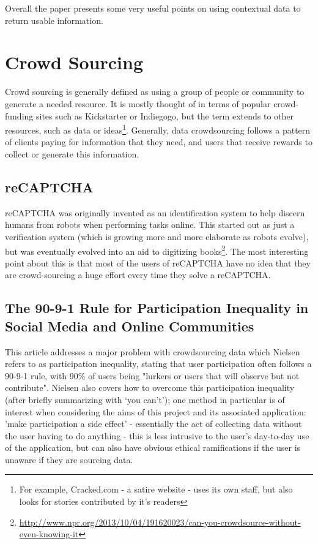 \documentclass[11pt]{informatics-report}
\begin{document}
Overall the paper presents some very useful points on using contextual data to return usable information.

\section{Crowd Sourcing}

Crowd sourcing is generally defined as using a group of people or community to generate a needed resource. It is mostly thought of in terms of popular crowd-funding sites such as Kickstarter or Indiegogo, but the term extends to other resources, such as data or ideas\footnote{For example, Cracked.com - a satire website - uses its own staff, but also looks for stories contributed by it's readers}. Generally, data crowdsourcing follows a pattern of clients paying for information that they need, and users that receive rewards to collect or generate this information.

\subsection{reCAPTCHA} 

reCAPTCHA was originally invented as an identification system to help discern humans from robots when performing tasks online. This started out as just a verification system (which is growing more and more elaborate as robots evolve), but was eventually evolved into an aid to digitizing books\footnote{\url{http://www.npr.org/2013/10/04/191620023/can-you-crowdsource-without-even-knowing-it}}. The most interesting point about this is that most of the users of reCAPTCHA have no idea that they are crowd-sourcing a huge effort every time they solve a reCAPTCHA.

\subsection{The 90-9-1 Rule for Participation Inequality in Social Media and Online Communities\cite{participationinequality}}

This article addresses a major problem with crowdsourcing data which Nielsen refers to as participation inequality, stating that user participation often follows a 90-9-1 rule, with 90\% of users being "lurkers or users that will observe but not contribute"\cite{participationinequality}. Nielsen also covers how to overcome this participation inequality (after briefly summarizing with ‘you can't'); one method in particular is of interest when considering the aims of this project and its associated application: 'make participation a side effect'  - essentially the act of collecting data without the user having to do anything - this is less intrusive to the user's day-to-day use of the application, but can also have obvious ethical ramifications if the user is unaware if they are sourcing data.
\end{document}
